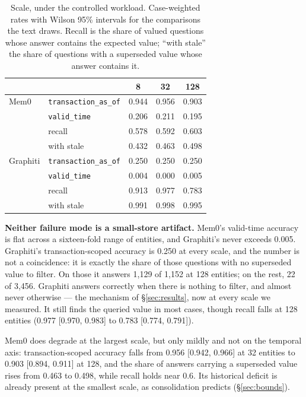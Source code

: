 \documentclass[conference]{IEEEtran}
\begin{document}
\begin{table}[t]
\centering
\caption{Scale, under the controlled workload. Case-weighted rates with
Wilson 95\% intervals for the comparisons the text draws. Recall is the share
of valued questions whose answer contains the expected value; ``with stale''
the share of questions with a superseded value whose answer contains it.}
\label{tab:scale}
\footnotesize
\setlength{\tabcolsep}{3.5pt}
\begin{tabular}{@{}llccc@{}}
\toprule
& & 8 & 32 & 128 \\
\midrule
Mem0     & \texttt{transaction\_as\_of} & 0.944 & 0.956 & 0.903 \\
         & \texttt{valid\_time}         & 0.206 & 0.211 & 0.195 \\
         & recall                       & 0.578 & 0.592 & 0.603 \\
         & with stale                   & 0.432 & 0.463 & 0.498 \\
\midrule
Graphiti & \texttt{transaction\_as\_of} & 0.250 & 0.250 & 0.250 \\
         & \texttt{valid\_time}         & 0.004 & 0.000 & 0.005 \\
         & recall                       & 0.913 & 0.977 & 0.783 \\
         & with stale                   & 0.991 & 0.998 & 0.995 \\
\bottomrule
\end{tabular}
\end{table}

\textbf{Neither failure mode is a small-store artifact.} Mem0's valid-time
accuracy is flat across a sixteen-fold range of entities, and Graphiti's never
exceeds 0.005. Graphiti's transaction-scoped accuracy is 0.250 at every scale,
and the number is not a coincidence: it is exactly the share of those questions
with no superseded value to filter. On those it answers 1{,}129 of 1{,}152 at
128 entities; on the rest, 22 of 3{,}456. Graphiti answers correctly when there
is nothing to filter, and almost never otherwise --- the mechanism of
\S\ref{sec:results}, now at every scale we measured. It still finds the
queried value in most cases, though recall falls at 128 entities
(0.977 [0.970, 0.983] to 0.783 [0.774, 0.791]).

Mem0 does degrade at the largest scale, but only mildly and not on the
temporal axis: transaction-scoped accuracy falls from 0.956 [0.942, 0.966] at
32 entities to 0.903 [0.894, 0.911] at 128, and the share of answers carrying a
superseded value rises from 0.463 to 0.498, while recall holds near 0.6. Its
historical deficit is already present at the smallest scale, as consolidation
predicts (\S\ref{sec:bounds}).
\end{document}
